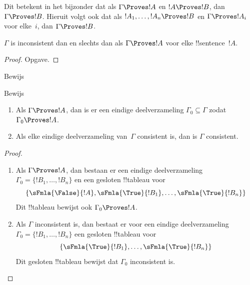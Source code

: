 \documentclass[../../../include/open-logic-section]{subfiles}
\begin{document}
Dit betekent in het bijzonder dat als $\Gamma \Proves !A$ en $!A
\Proves !B$, dan $\Gamma \Proves !B$. Hieruit volgt ook dat als $!A_1,
\dots, !A_n \Proves !B$ en $\Gamma \Proves !A_i$ voor elke~$i$, dan
$\Gamma \Proves !B$.

\begin{prop}
$\Gamma$ is inconsistent dan en slechts dan als $\Gamma \Proves !A$
voor elke !!{sentence}~$!A$.
\end{prop}

\begin{proof}
Opgave.
\end{proof}

\begin{prob}
Bewijs 
\end{prob}
\tagendprob

\begin{prob}
Bewijs 
\end{prob}
\tagendprob

\begin{prop}[Compactheid]
  \begin{enumerate}
  \item Als $\Gamma \Proves !A$, dan is er een eindige deelverzameling
    $\Gamma_0 \subseteq \Gamma$ zodat $\Gamma_0 \Proves !A$.
  \item Als elke eindige deelverzameling van~$\Gamma$ consistent is,
    dan is $\Gamma$ consistent.
  \end{enumerate}
\end{prop}

\begin{proof}
  \begin{enumerate}
    \item Als $\Gamma \Proves !A$, dan bestaan er een eindige
      deelverzameling $\Gamma_0 = \{!B_1, \dots, !B_n\}$ en een
      gesloten !!{tableau} voor
      \[
      \{\sFmla{\False}{!A}, \sFmla{\True}{!B_1}, \dots, \sFmla{\True}{!B_n}\}
      \]
      Dit !!{tableau} bewijst ook $\Gamma_0 \Proves !A$.
    \item Als $\Gamma$ inconsistent is, dan bestaat er voor een eindige
      deelverzameling $\Gamma_0 = \{!B_1, \dots, !B_n\}$ een gesloten
      !!{tableau} voor
      \[
      \{\sFmla{\True}{!B_1}, \dots, \sFmla{\True}{!B_n}\}
      \]
      Dit gesloten !!{tableau} bewijst dat $\Gamma_0$ inconsistent is.
  \end{enumerate}
\end{proof}
\end{document}
